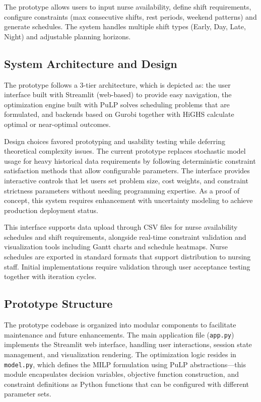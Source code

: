 \documentclass[1pt,a4paper]{article}
\begin{document}
The prototype allows users to input nurse availability, define shift requirements, configure constraints (max consecutive shifts, rest periods, weekend patterns) and generate schedules. The system handles multiple shift types (Early, Day, Late, Night) and adjustable planning horizons.

\subsection{System Architecture and Design}

The prototype follows a 3-tier architecture, which is depicted as: the user interface built with Streamlit (web-based) to provide easy navigation, the optimization engine built with PuLP solves scheduling problems that are formulated, and backends based on Gurobi together with HiGHS calculate optimal or near-optimal outcomes.

Design choices favored prototyping and usability testing while deferring theoretical complexity issues. The current prototype replaces stochastic model usage for heavy historical data requirements by following deterministic constraint satisfaction methods that allow configurable parameters. The interface provides interactive controls that let users set problem size, cost weights, and constraint strictness parameters without needing programming expertise. As a proof of concept, this system requires enhancement with uncertainty modeling to achieve production deployment status.

This interface supports data upload through CSV files for nurse availability schedules and shift requirements, alongside real-time constraint validation and visualization tools including Gantt charts and schedule heatmaps. Nurse schedules are exported in standard formats that support distribution to nursing staff. Initial implementations require validation through user acceptance testing together with iteration cycles.

\subsection{Prototype Structure}

The prototype codebase is organized into modular components to facilitate maintenance and future enhancements. The main application file (\texttt{app.py}) implements the Streamlit web interface, handling user interactions, session state management, and visualization rendering. The optimization logic resides in \texttt{model.py}, which defines the MILP formulation using PuLP abstractions—this module encapsulates decision variables, objective function construction, and constraint definitions as Python functions that can be configured with different parameter sets.
\end{document}
